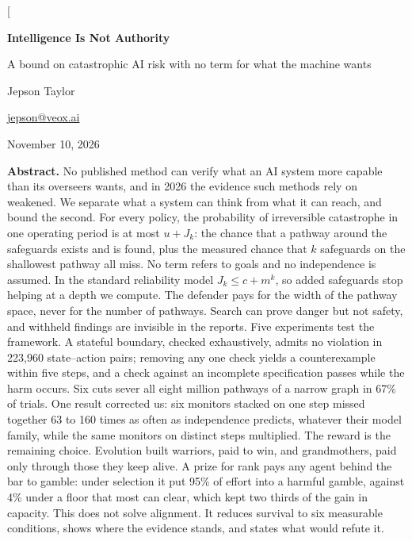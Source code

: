 \documentclass[10pt,twocolumn,letterpaper]{article}
\theoremstyle{definition}
\newcommand{\CutSeverNarrowSix}{67}
\newcommand{\BndChecks}{223{,}960}
\newcommand{\ScWar}{95}
\newcommand{\ScFloor}{4}
\newcommand{\MonRatioLow}{63}
\newcommand{\MonRatioHigh}{160}
\begin{document}
\makeatletter
\twocolumn[{%
\begin{@twocolumnfalse}
\thispagestyle{plain}
\begin{center}
{\fontsize{25}{29}\selectfont\bfseries Intelligence Is {\color{warn}Not} Authority\par}
\vspace{6pt}
{\fontsize{12.5}{16}\selectfont A bound on catastrophic AI risk with no term for what the machine wants\par}
\vspace{10pt}
{\large Jepson Taylor\par}
\vspace{2pt}
{\normalsize\href{mailto:jepson@veox.ai}{jepson@veox.ai}\par}
\vspace{2pt}
{\small November 10, 2026\par}
\vspace{10pt}
\begin{minipage}{0.9\textwidth}
\small
\noindent\textbf{Abstract.}\enspace
No published method can verify what an AI system more capable than its overseers wants, and in 2026 the evidence such methods rely on weakened. We separate what a system can think from what it can reach, and bound the second. For every policy, the probability of irreversible catastrophe in one operating period is at most $u+J_{k}$: the chance that a pathway around the safeguards exists and is found, plus the measured chance that $k$ safeguards on the shallowest pathway all miss. No term refers to goals and no independence is assumed. In the standard reliability model $J_{k}\le c+m^{k}$, so added safeguards stop helping at a depth we compute. The defender pays for the width of the pathway space, never for the number of pathways. Search can prove danger but not safety, and withheld findings are invisible in the reports. Five experiments test the framework. A stateful boundary, checked exhaustively, admits no violation in \BndChecks{} state--action pairs; removing any one check yields a counterexample within five steps, and a check against an incomplete specification passes while the harm occurs. Six cuts sever all eight million pathways of a narrow graph in \CutSeverNarrowSix\% of trials. One result corrected us: six monitors stacked on one step missed together \MonRatioLow{} to \MonRatioHigh{} times as often as independence predicts, whatever their model family, while the same monitors on distinct steps multiplied. The reward is the remaining choice. Evolution built warriors, paid to win, and grandmothers, paid only through those they keep alive. A prize for rank pays any agent behind the bar to gamble: under selection it put \ScWar\% of effort into a harmful gamble, against \ScFloor\% under a floor that most can clear, which kept two thirds of the gain in capacity. This does not solve alignment. It reduces survival to six measurable conditions, shows where the evidence stands, and states what would refute it.

\end{minipage}
\end{center}
\end{@twocolumnfalse}}
\end{document}
